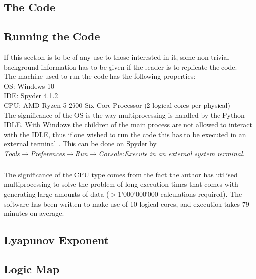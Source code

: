 \documentclass[9pt, a4paper]{report}
\begin{document}
\printbibliography[
heading=bibintoc,
title={Bibliography}
]


\begin{appendices}

\chapter{The Code}
\section{Running the Code}
If this section is to be of any use to those interested in it,
some non-trivial background information has to be given if the reader
is to replicate the code.\\
The machine used to run the code has the following properties:\\
OS: Windows 10\\
IDE: Spyder 4.1.2\\
CPU: AMD Ryzen 5 2600 Six-Core Processor (2 logical cores per physical)\\
The significance of the OS is the way multiprocessing is handled by
the Python IDLE. With Windows the children of the main process are not allowed
to interact with the IDLE, thus if one wished to run the code this has to be executed
in an external terminal \cite{multistackdebug}. This can be done on Spyder by\\
\textit{Tools$\rightarrow$Preferences$\rightarrow$Run$\rightarrow$Console:Execute in an external system terminal}.
\paragraph{}
The significance of the CPU type comes from the fact the author has
utilised multiprocessing to solve the problem of long execution times
that comes with generating large amounts of data ($>$1'000'000'000 calculations required).
The software has been written to make use of 10 logical cores, and execution takes
79 minutes on average.

\newpage
\section{Lyapunov Exponent}
\label{appendix:lyapunov}


\section{Logic Map}
\label{appendix:logicmap}



\end{appendices}
\end{document}
